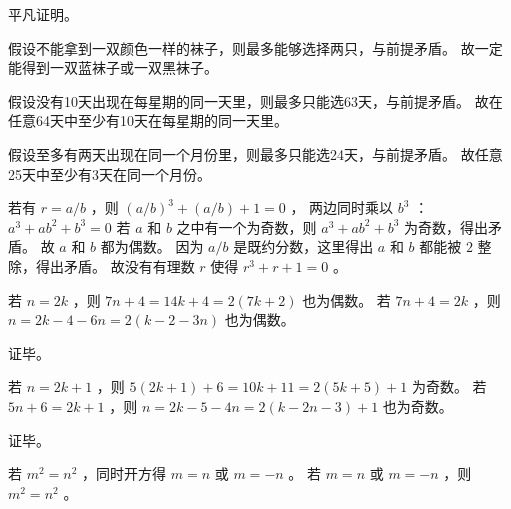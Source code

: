 {{        %
        \begin{practices}
            平凡证明。
        \end{practices}

        \begin{practices}
            假设不能拿到一双颜色一样的袜子，则最多能够选择两只，与前提矛盾。
            故一定能得到一双蓝袜子或一双黑袜子。
        \end{practices}

        \begin{practices}
            假设没有10天出现在每星期的同一天里，则最多只能选63天，与前提矛盾。
            故在任意64天中至少有10天在每星期的同一天里。
        \end{practices}

        \begin{practices}
            假设至多有两天出现在同一个月份里，则最多只能选24天，与前提矛盾。
            故任意25天中至少有3天在同一个月份。
        \end{practices}

        \begin{practices}
            若有 $r = a / b$ ，则 $(a / b)^3 + (a / b) + 1 = 0$ ，
            两边同时乘以 $b^3$ ：
            $a^3 + ab^2 + b^3 = 0$
            若 $a$ 和 $b$ 之中有一个为奇数，则 $a^3 + ab^2 + b^3$ 为奇数，得出矛盾。
            故 $a$ 和 $b$ 都为偶数。
            因为 $a / b$ 是既约分数，这里得出 $a$ 和 $b$ 都能被 $2$ 整除，得出矛盾。
            故没有有理数 $r$ 使得 $r^3 + r + 1 = 0$ 。
        \end{practices}

        \begin{practices}
            若 $n = 2k$ ，则 $7n + 4 = 14k + 4 = 2(7k + 2)$ 也为偶数。
            若 $7n + 4 = 2k$ ，则 $n = 2k - 4 - 6n = 2(k - 2 - 3n)$ 也为偶数。

            证毕。
        \end{practices}

        \begin{practices}
            若 $n = 2k + 1$ ，则 $5(2k + 1) + 6 = 10k + 11 = 2(5k + 5) + 1$ 为奇数。
            若 $5n + 6 = 2k + 1$ ，则 $n = 2k - 5 - 4n = 2(k - 2n - 3) + 1$ 也为奇数。

            证毕。
        \end{practices}

        \begin{practices}
            若 $m^2 = n^2$ ，同时开方得 $m = n$ 或 $m = -n$ 。
            若 $m = n$ 或 $m = -n$ ，则 $m^2 = n^2$ 。


\end{practices}}}
